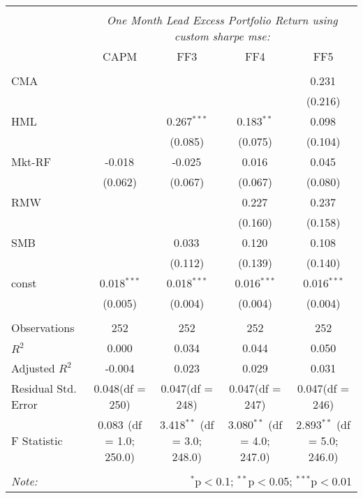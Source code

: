 \begin{table}[!htbp] \centering
\begin{tabular}{@{\extracolsep{5pt}}lcccc}
\\[-1.8ex]\hline
\hline \\[-1.8ex]
& \multicolumn{4}{c}{\textit{One Month Lead Excess Portfolio Return using custom sharpe mse:}} \
\cr \cline{4-5}
\\[-1.8ex] & CAPM & FF3 & FF4 & FF5 \\
\hline \\[-1.8ex]
 CMA & & & & 0.231$^{}$ \\
  & & & & (0.216) \\
 HML & & 0.267$^{***}$ & 0.183$^{**}$ & 0.098$^{}$ \\
  & & (0.085) & (0.075) & (0.104) \\
 Mkt-RF & -0.018$^{}$ & -0.025$^{}$ & 0.016$^{}$ & 0.045$^{}$ \\
  & (0.062) & (0.067) & (0.067) & (0.080) \\
 RMW & & & 0.227$^{}$ & 0.237$^{}$ \\
  & & & (0.160) & (0.158) \\
 SMB & & 0.033$^{}$ & 0.120$^{}$ & 0.108$^{}$ \\
  & & (0.112) & (0.139) & (0.140) \\
 const & 0.018$^{***}$ & 0.018$^{***}$ & 0.016$^{***}$ & 0.016$^{***}$ \\
  & (0.005) & (0.004) & (0.004) & (0.004) \\
\hline \\[-1.8ex]
 Observations & 252 & 252 & 252 & 252 \\
 $R^2$ & 0.000 & 0.034 & 0.044 & 0.050 \\
 Adjusted $R^2$ & -0.004 & 0.023 & 0.029 & 0.031 \\
 Residual Std. Error & 0.048(df = 250) & 0.047(df = 248) & 0.047(df = 247) & 0.047(df = 246)  \\
 F Statistic & 0.083$^{}$ (df = 1.0; 250.0) & 3.418$^{**}$ (df = 3.0; 248.0) & 3.080$^{**}$ (df = 4.0; 247.0) & 2.893$^{**}$ (df = 5.0; 246.0) \\
\hline
\hline \\[-1.8ex]
\textit{Note:} & \multicolumn{4}{r}{$^{*}$p$<$0.1; $^{**}$p$<$0.05; $^{***}$p$<$0.01} \\
\end{tabular}
\end{table}
